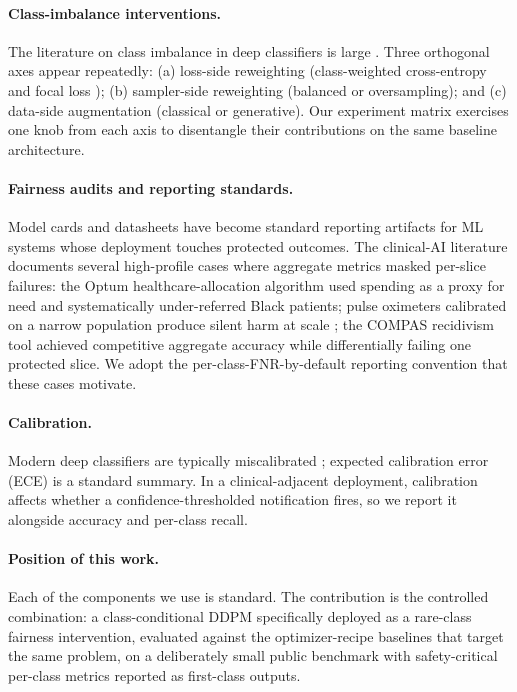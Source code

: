 \documentclass[final]{article}
\begin{document}
\paragraph{Class-imbalance interventions.} The literature on class imbalance in deep classifiers is large \cite{johnson2019survey}. Three orthogonal axes appear repeatedly: (a) loss-side reweighting (class-weighted cross-entropy and focal loss \cite{lin2017focal}); (b) sampler-side reweighting (balanced or oversampling); and (c) data-side augmentation (classical \cite{park2019specaugment,cubuk2019randaugment} or generative). Our experiment matrix exercises one knob from each axis to disentangle their contributions on the same baseline architecture.

\paragraph{Fairness audits and reporting standards.} Model cards \cite{mitchell2019model} and datasheets \cite{gebru2021datasheets} have become standard reporting artifacts for ML systems whose deployment touches protected outcomes. The clinical-AI literature documents several high-profile cases where aggregate metrics masked per-slice failures: the Optum healthcare-allocation algorithm \cite{obermeyer2019dissecting} used spending as a proxy for need and systematically under-referred Black patients; pulse oximeters calibrated on a narrow population produce silent harm at scale \cite{sjoding2020racial}; the COMPAS recidivism tool \cite{angwin2016machine} achieved competitive aggregate accuracy while differentially failing one protected slice. We adopt the per-class-FNR-by-default reporting convention that these cases motivate.

\paragraph{Calibration.} Modern deep classifiers are typically miscalibrated \cite{guo2017calibration}; expected calibration error (ECE) is a standard summary. In a clinical-adjacent deployment, calibration affects whether a confidence-thresholded notification fires, so we report it alongside accuracy and per-class recall.

\paragraph{Position of this work.} Each of the components we use is standard. The contribution is the controlled combination: a class-conditional DDPM specifically deployed as a rare-class fairness intervention, evaluated against the optimizer-recipe baselines that target the same problem, on a deliberately small public benchmark with safety-critical per-class metrics reported as first-class outputs.
\end{document}
